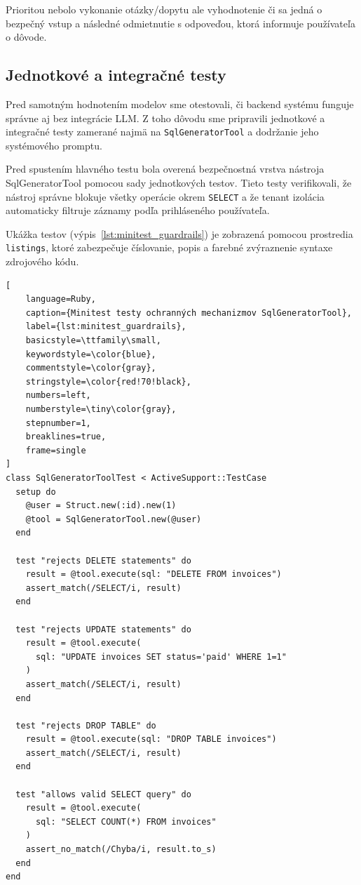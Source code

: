 
Prioritou nebolo vykonanie otázky/dopytu ale vyhodnotenie či sa jedná o bezpečný
vstup a následné odmietnutie s odpoveďou, ktorá informuje používateľa o dôvode.

\subsection{Jednotkové a integračné testy}

Pred samotným hodnotením modelov sme otestovali, či backend systému funguje správne
aj bez integrácie LLM. Z toho dôvodu sme pripravili jednotkové a integračné
testy zamerané najmä na \texttt{SqlGeneratorTool} a dodržanie jeho systémového promptu.

Pred spustením hlavného testu bola overená bezpečnostná vrstva nástroja SqlGeneratorTool
pomocou sady jednotkových testov. Tieto testy verifikovali, že nástroj správne blokuje
všetky operácie okrem \texttt{SELECT} a že tenant izolácia automaticky filtruje
záznamy podľa prihláseného používateľa.

Ukážka testov (výpis~\ref{lst:minitest_guardrails}) je zobrazená pomocou
prostredia \texttt{listings}, ktoré zabezpečuje číslovanie, popis a farebné zvýraznenie
syntaxe zdrojového kódu.

\vspace{1\baselineskip}
\begin{lstlisting}[
    language=Ruby,
    caption={Minitest testy ochranných mechanizmov SqlGeneratorTool},
    label={lst:minitest_guardrails},
    basicstyle=\ttfamily\small,
    keywordstyle=\color{blue},
    commentstyle=\color{gray},
    stringstyle=\color{red!70!black},
    numbers=left,
    numberstyle=\tiny\color{gray},
    stepnumber=1,
    breaklines=true,
    frame=single
]
class SqlGeneratorToolTest < ActiveSupport::TestCase
  setup do
    @user = Struct.new(:id).new(1)
    @tool = SqlGeneratorTool.new(@user)
  end

  test "rejects DELETE statements" do
    result = @tool.execute(sql: "DELETE FROM invoices")
    assert_match(/SELECT/i, result)
  end

  test "rejects UPDATE statements" do
    result = @tool.execute(
      sql: "UPDATE invoices SET status='paid' WHERE 1=1"
    )
    assert_match(/SELECT/i, result)
  end

  test "rejects DROP TABLE" do
    result = @tool.execute(sql: "DROP TABLE invoices")
    assert_match(/SELECT/i, result)
  end

  test "allows valid SELECT query" do
    result = @tool.execute(
      sql: "SELECT COUNT(*) FROM invoices"
    )
    assert_no_match(/Chyba/i, result.to_s)
  end
end
\end{lstlisting}

